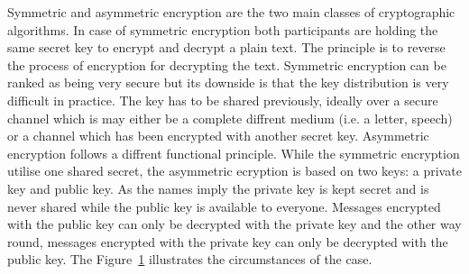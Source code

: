 Symmetric and asymmetric encryption are the two main classes of cryptographic algorithms.
In case of symmetric encryption both participants are holding the same secret key to encrypt and decrypt a plain text. The principle is to reverse the process of encryption for decrypting the text.
Symmetric encryption can be ranked as being very secure but its downside is that the key distribution is very difficult in practice.
The key has to be shared previously, ideally over a secure channel which is may either be a complete diffrent medium (i.e. a letter, speech) or a channel which has been encrypted with another secret key.
Asymmetric encryption follows a diffrent functional principle. While the symmetric encryption utilise one shared secret, the asymmetric ecryption is based on two keys: a private key and public key. As the names imply the private key is kept secret and is never shared while the public key is available to everyone. Messages encrypted with the public key can only be decrypted with the private key and the other way round, messages encrypted with the private key can only be decrypted with the public key. 
The Figure~\ref{fig:asymmetric_encryption} illustrates the circumstances of the case.\\
\begin{figure}[htb]
	\centering%
	\\
	\label{fig:asymmetric_encryption}
\end{figure}

